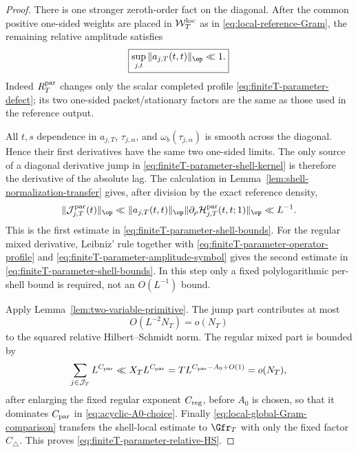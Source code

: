 \begin{proof}
There is one stronger zeroth-order fact on the diagonal.  After the common
positive one-sided weights are placed in $\mathcal W_T^{\rm loc}$ as in
\eqref{eq:local-reference-Gram}, the remaining relative amplitude satisfies
\begin{equation}
\boxed{
\sup_{j,t}\|a_{j,T}(t,t)\|_{\op}\ll1.
}
\label{eq:finiteT-parameter-diagonal-amplitude}
\end{equation}
Indeed $R_T^{\rm par}$ changes only the scalar completed profile
\eqref{eq:finiteT-parameter-defect}; its two one-sided packet/stationary factors
are the same as those used in the reference output.

All $t,s$ dependence in $a_{j,T}$,
$\tau_{j,\alpha}$, and $\omega_b(\tau_{j,\alpha})$ is smooth across the
diagonal.  Hence their first derivatives have the same two one-sided limits.
The only source of a diagonal derivative jump in
\eqref{eq:finiteT-parameter-shell-kernel} is therefore the derivative of the
absolute lag.  The calculation in
Lemma~\ref{lem:shell-normalization-transfer} gives, after division by the exact
reference density,
\[
\|\mathcal J^{\rm par}_{j,T}(t)\|_{\op}
\ll
\|a_{j,T}(t,t)\|_{\op}
\|\partial_\rho\mathcal H^{\rm par}_{j,T}(t,t;1)\|_{\op}
\ll L^{-1}.
\]
This is the first estimate in \eqref{eq:finiteT-parameter-shell-bounds}.  For
the regular mixed derivative, Leibniz' rule together with
\eqref{eq:finiteT-parameter-operator-profile} and
\eqref{eq:finiteT-parameter-amplitude-symbol} gives the second estimate in
\eqref{eq:finiteT-parameter-shell-bounds}.  In this step only a fixed
polylogarithmic per-shell bound is required, not an $O(L^{-1})$ bound.

Apply Lemma~\ref{lem:two-variable-primitive}.  The jump part contributes at
most
\[
O(L^{-2}N_T)=o(N_T)
\]
to the squared relative Hilbert--Schmidt norm.  The regular mixed part is
bounded by
\[
\sum_{j\in\mathcal J_T}L^{C_{\rm par}}
\ll X_TL^{C_{\rm par}}
=TL^{C_{\rm par}-A_0+O(1)}=o(N_T),
\]
after enlarging the fixed regular exponent $C_{\rm reg}$, before $A_0$ is
chosen, so that it dominates $C_{\rm par}$ in
\eqref{eq:acyclic-A0-choice}.  Finally
\eqref{eq:local-global-Gram-comparison} transfers the shell-local estimate to
$\Gfr_T$ with only the fixed factor $C_\triangle$.  This proves
\eqref{eq:finiteT-parameter-relative-HS}.
\end{proof}

